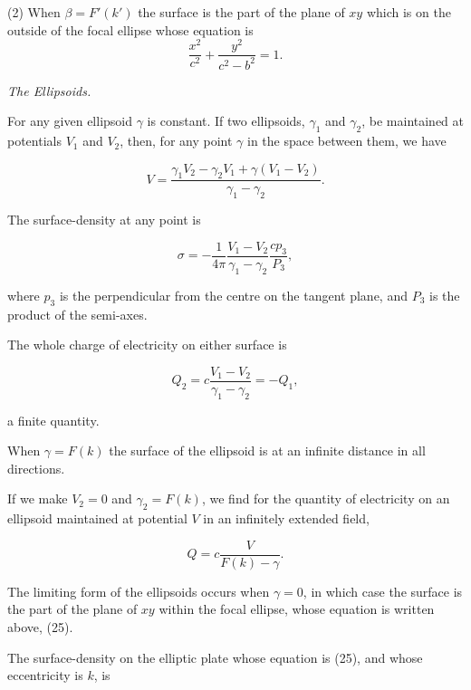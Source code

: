 \documentclass[11pt,a4paper]{article}
\begin{document}
(2) When $\beta=F'(k')$ the surface is the part of the plane of $xy$ which is on the outside of the focal ellipse whose equation is
\begin{equation}\tag{25}
\frac{x^2}{c^2}+\frac{y^2}{c^2-b^2}=1.
\end{equation}

{\centering\itshape The Ellipsoids.\par}

For any given ellipsoid $\gamma$ is constant. If two ellipsoids, $\gamma_1$ and $\gamma_2$, be maintained at potentials $V_1$ and $V_2$, then, for any point $\gamma$ in the space between them, we have

\begin{equation}\tag{26}
V=\frac{\gamma_1V_2-\gamma_2V_1+\gamma(V_1-V_2)}{\gamma_1-\gamma_2}.
\end{equation}

The surface-density at any point is

\begin{equation}\tag{27}
\sigma=-\frac{1}{4\pi}\frac{V_1-V_2}{\gamma_1-\gamma_2}\frac{cp_3}{P_3},
\end{equation}

where $p_3$ is the perpendicular from the centre on the tangent plane, and $P_3$ is the product of the semi-axes.

The whole charge of electricity on either surface is

\begin{equation}\tag{28}
Q_2=c\frac{V_1-V_2}{\gamma_1-\gamma_2}=-Q_1,
\end{equation}

a finite quantity.

When $\gamma=F(k)$ the surface of the ellipsoid is at an infinite distance in all directions.

If we make $V_2=0$ and $\gamma_2=F(k)$, we find for the quantity of electricity on an ellipsoid maintained at potential $V$ in an infinitely extended field,

\begin{equation}\tag{29}
Q=c\frac{V}{F(k)-\gamma}.
\end{equation}

The limiting form of the ellipsoids occurs when $\gamma=0$, in which case the surface is the part of the plane of $xy$ within the focal ellipse, whose equation is written above, (25).

The surface-density on the elliptic plate whose equation is (25), and whose eccentricity is $k$, is
\end{document}
